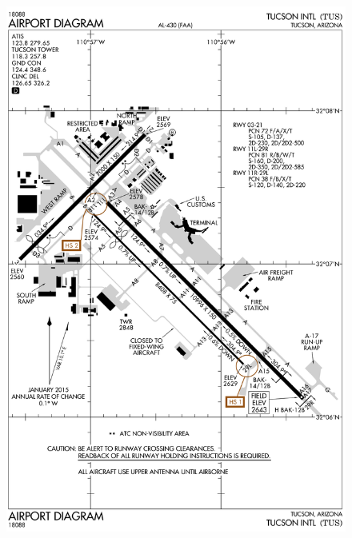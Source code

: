 \documentclass[12pt]{article}
\begin{document}
				\begin{figure}
					\centering
					\includegraphics[width=\linewidth]{Airport Diagram.png}
				\end{figure}
\end{document}
